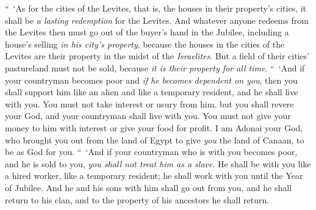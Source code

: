 \begin{biblechapter}
\verse “ ‘As for the cities of the Levites, that is, the houses in their property’s cities, it shall be \textit{a lasting redemption} for the Levites.
\verse And whatever anyone redeems from the Levites then must go out of the buyer’s hand in the Jubilee, including a house’s selling \textit{in his city’s property}, because the houses in the cities of the Levites are their property in the midst of the \textit{Israelites}.
\verse But a field of their cities’ pastureland must not be sold, because \textit{it is their property for all time}.
\verse “ ‘And if your countryman becomes poor and \textit{if he becomes dependent on you}, then you shall support him like an alien and like a temporary resident, and he shall live with you.
\verse You must not take interest or usury from him, but you shall revere your God, and your countryman shall live with you.
\verse You must not give your money to him with interest or give your food for profit.
\verse I am Adonai your God, who brought you out from the land of Egypt to give \textit{you} the land of Canaan, to be as God for you.
\verse “ ‘And if your countryman who is with you becomes poor, and he is sold to you, \textit{you shall not treat him as a slave}.
\verse He shall be with you like a hired worker, like a temporary resident; he shall work with you until the Year of Jubilee.
\verse And he and his sons with him shall go out from you, and he shall return to his clan, and to the property of his ancestors he shall return.

\end{biblechapter}
